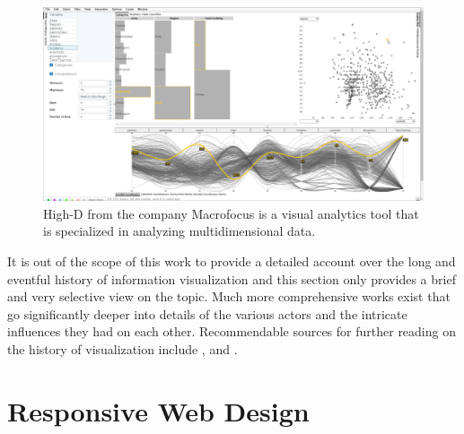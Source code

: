 \begin{figure}[tp]
    \centering
    \includegraphics[keepaspectratio,width=\linewidth,height=\fullh / 3]
    {images/high-d.png}
    \caption[Screenshot of High-D]{
        High-D from the company Macrofocus is a visual analytics tool that is specialized in analyzing multidimensional data. 
    }
    \label{fig:HighD}
\end{figure}

It is out of the scope of this work to provide a detailed account over the long and eventful history of information visualization and this section only provides a brief and very selective view on the topic. Much more comprehensive works exist that go significantly deeper into details of the various actors and the intricate influences they had on each other. Recommendable sources for further reading on the history of visualization include \cite{BriefHistoryOfDataVis}, \cite{HistoryOfDataVisAndGraphicCommunication} and \cite{HistoryOfInformationGraphics}.

\section{Responsive Web Design}
\label{sec:RWD}

